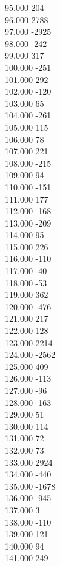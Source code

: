 { 95.000	204 \\
 96.000	2788 \\
 97.000	-2925 \\
 98.000	-242 \\
 99.000	317 \\
 100.000	-251 \\
 101.000	292 \\
 102.000	-120 \\
 103.000	65 \\
 104.000	-261 \\
 105.000	115 \\
 106.000	78 \\
 107.000	221 \\
 108.000	-215 \\
 109.000	94 \\
 110.000	-151 \\
 111.000	177 \\
 112.000	-168 \\
 113.000	-209 \\
 114.000	95 \\
 115.000	226 \\
 116.000	-110 \\
 117.000	-40 \\
 118.000	-53 \\
 119.000	362 \\
 120.000	-476 \\
 121.000	217 \\
 122.000	128 \\
 123.000	2214 \\
 124.000	-2562 \\
 125.000	409 \\
 126.000	-113 \\
 127.000	-96 \\
 128.000	-163 \\
 129.000	51 \\
 130.000	114 \\
 131.000	72 \\
 132.000	73 \\
 133.000	2924 \\
 134.000	-440 \\
 135.000	-1678 \\
 136.000	-945 \\
 137.000	3 \\
 138.000	-110 \\
 139.000	121 \\
 140.000	94 \\
 141.000	249 \\
}
